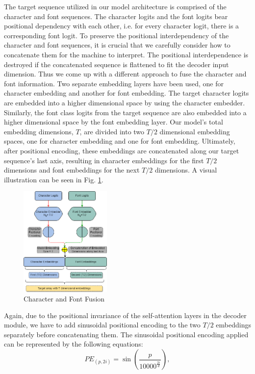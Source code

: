 \documentclass[conference]{IEEEtran}
\begin{document}
The target sequence utilized in our model architecture is comprised of the character and font sequences. The character logits and the font logits bear positional dependency with each other, i.e. for every character logit, there is a corresponding font logit. To preserve the positional interdependency of the character and font sequences, it is crucial that we carefully consider how to concatenate them for the machine to interpret. The positional interdependence is destroyed if the concatenated sequence is flattened to fit the decoder input dimension. Thus we come up with a different approach to fuse the character and font information. Two separate embedding layers have been used, one for character embedding and another for font embedding. The target character logits are embedded into a higher dimensional space by using the character embedder. Similarly, the font class logits from the target sequence are also embedded into a higher dimensional space by the font embedding layer. Our model's total embedding dimensions,  \(T\), are divided into two  \(T/2\) dimensional embedding spaces, one for character embedding and one for font embedding. Ultimately, after positional encoding, these embeddings are concatenated along our target sequence's last axis, resulting in character embeddings for the first  \(T/2\) dimensions and font embeddings for the next  \(T/2\) dimensions. A visual illustration can be seen in Fig. \ref{cf}.

\begin{figure}[htbp]
    \centering
    \includegraphics[width=0.4\textwidth]{figures/Character&Font .png}
    \caption{Character and Font Fusion}
    \label{cf}
\end{figure}

Again, due to the positional invariance of the self-attention layers in the decoder module, we have to add sinusoidal positional encoding \cite{vaswani2017attention} to the two \(T/2\) embeddings separately before concatenating them. The sinusoidal positional encoding applied can be represented by the following equations:
\begin{equation}\label{1D_pos_1}
{PE}_{(p, 2i)} = \sin\left(\frac{{p}}{{10000}^{\frac{2i}{d}}}\right), \tag{2}
\end{equation}
\end{document}
